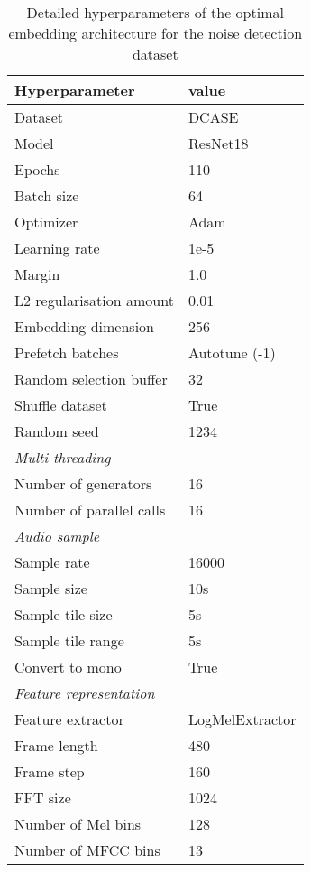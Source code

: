 \begin{table}[ht]
    \centering
    \caption{Detailed hyperparameters of the optimal embedding architecture for the noise detection dataset}
	\label{tab:Hyperparameters-Detailed-DCASE}
    \begin{tabular}{l|l}
        \toprule
        \textbf{Hyperparameter} & \textbf{value} \\ 
        \midrule[1pt]
        Dataset & DCASE \\
        \hline
        Model & ResNet18 \\ 
        \hline
        Epochs & 110 \\ 
        \hline
        Batch size & 64 \\ 
        \hline
        Optimizer & Adam \\ 
        \hline
        Learning rate & 1e-5 \\
        \hline
        Margin & 1.0 \\
        \hline
        L2 regularisation amount & 0.01 \\
        \hline
        Embedding dimension & 256 \\
        \hline
        Prefetch batches & Autotune (-1) \\ 
        \hline
        Random selection buffer & 32 \\ 
        \hline
        Shuffle dataset & True \\
        \hline
        Random seed & 1234 \\
        \midrule[1pt]
        \multicolumn{2}{l}{\textit{Multi threading}} \\
        \midrule[1pt]
        Number of generators & 16 \\ 
        \hline
        Number of parallel calls & 16 \\
        \midrule[1pt]
        \multicolumn{2}{l}{\textit{Audio sample}} \\
        \midrule[1pt]
        Sample rate & 16000 \\ 
        \hline
        Sample size & 10s \\
        \hline
        Sample tile size & 5s \\
        \hline
        Sample tile range & 5s \\
        \hline
        Convert to mono & True \\
        \midrule[1pt]
        \multicolumn{2}{l}{\textit{Feature representation}} \\
        \midrule[1pt]
        Feature extractor & LogMelExtractor \\ 
        \hline
        Frame length & 480 \\
        \hline
        Frame step & 160 \\
        \hline
        FFT size & 1024 \\
        \hline
        Number of Mel bins & 128 \\
        \hline
        Number of MFCC bins & 13 \\
        \bottomrule
    \end{tabular}
\end{table}

